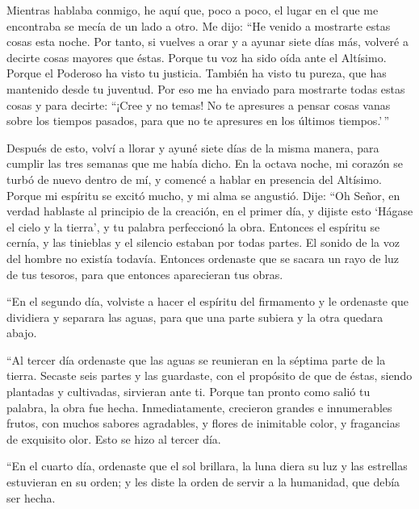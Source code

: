  Mientras hablaba conmigo, he aquí que, poco a poco, el
lugar en el que me encontraba se mecía de un lado a otro.
 Me dijo: ``He venido a mostrarte estas cosas esta noche.
 Por tanto, si vuelves a orar y a ayunar siete días más,
volveré a decirte cosas mayores que éstas.  Porque tu voz
ha sido oída ante el Altísimo. Porque el Poderoso ha visto tu justicia.
También ha visto tu pureza, que has mantenido desde tu juventud.
 Por eso me ha enviado para mostrarte todas estas cosas y
para decirte: ``¡Cree y no temas!  No te apresures a
pensar cosas vanas sobre los tiempos pasados, para que no te apresures
en los últimos tiempos.'\,''

 Después de esto, volví a llorar y ayuné siete días de la
misma manera, para cumplir las tres semanas que me había dicho.
 En la octava noche, mi corazón se turbó de nuevo dentro
de mí, y comencé a hablar en presencia del Altísimo. 
Porque mi espíritu se excitó mucho, y mi alma se angustió.
 Dije: ``Oh Señor, en verdad hablaste al principio de la
creación, en el primer día, y dijiste esto `Hágase el cielo y la
tierra', y tu palabra perfeccionó la obra.  Entonces el
espíritu se cernía, y las tinieblas y el silencio estaban por todas
partes. El sonido de la voz del hombre no existía todavía.
 Entonces ordenaste que se sacara un rayo de luz de tus
tesoros, para que entonces aparecieran tus obras.

 ``En el segundo día, volviste a hacer el espíritu del
firmamento y le ordenaste que dividiera y separara las aguas, para que
una parte subiera y la otra quedara abajo.

 ``Al tercer día ordenaste que las aguas se reunieran en
la séptima parte de la tierra. Secaste seis partes y las guardaste, con
el propósito de que de éstas, siendo plantadas y cultivadas, sirvieran
ante ti.  Porque tan pronto como salió tu palabra, la
obra fue hecha.  Inmediatamente, crecieron grandes e
innumerables frutos, con muchos sabores agradables, y flores de
inimitable color, y fragancias de exquisito olor. Esto se hizo al tercer
día.

 ``En el cuarto día, ordenaste que el sol brillara, la
luna diera su luz y las estrellas estuvieran en su orden;
 y les diste la orden de servir a la humanidad, que debía
ser hecha.

